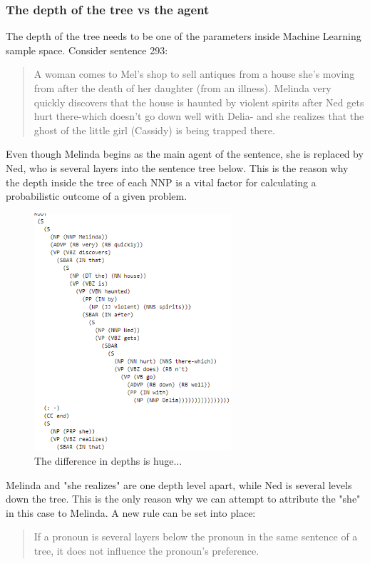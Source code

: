 \documentclass{article}
\begin{document}
\subsubsection{The depth of the tree vs the agent}
The depth of the tree needs to be one of the parameters inside Machine Learning sample space. Consider sentence 293:
\begin{quote}
    A woman comes to Mel's shop to sell antiques from a house she's moving from after the death of her daughter (from an illness). Melinda very quickly discovers that the house is haunted by violent spirits after Ned gets hurt there-which doesn't go down well with Delia- and she realizes that the ghost of the little girl (Cassidy) is being trapped there.	
\end{quote}
Even though Melinda begins as the main agent of the sentence, she is replaced by Ned, who is several layers into the sentence tree below. This is the reason why the depth inside the tree of each NNP is a vital factor for calculating a probabilistic outcome of a given problem.
\begin{figure}[H]
    \centering
\includegraphics[width=0.65\textwidth]{Example10.png}
    \caption{The difference in depths is huge...}
\end{figure}

\noindent Melinda and "she realizes" are one depth level apart, while Ned is several levels down the tree. This is the only reason why we can attempt to attribute the "she" in this case to Melinda. A new rule can be set into place:
\begin{quote}
    If a pronoun is several layers below the pronoun in the same sentence of a tree, it does not influence the pronoun's preference.
\end{quote}
\end{document}
